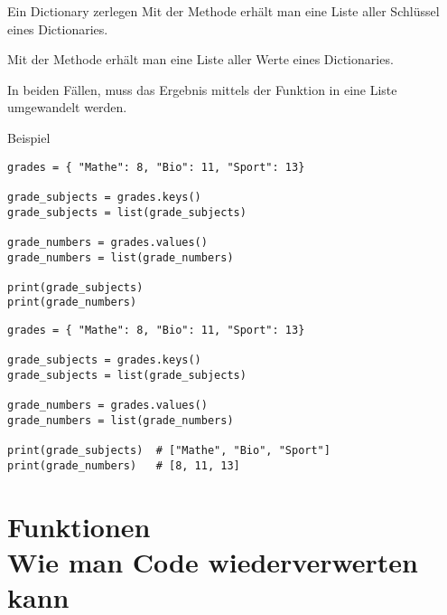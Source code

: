 \begin{fragile}

\begin{block}{Ein Dictionary zerlegen}
\vspace{2pt}
Mit der Methode  erhält man eine Liste aller Schlüssel eines Dictionaries. \pause

Mit der Methode  erhält man eine Liste aller Werte eines Dictionaries. \pause 

In beiden Fällen, muss das Ergebnis mittels der Funktion  in eine Liste umgewandelt werden. 
\end{block}


\vspace{12pt}
\pause 

\begin{exampleblock}{Beispiel}
\vspace{2pt}
\begin{overprint}
\begin{verbatim}
grades = { "Mathe": 8, "Bio": 11, "Sport": 13}

grade_subjects = grades.keys()
grade_subjects = list(grade_subjects)

grade_numbers = grades.values()
grade_numbers = list(grade_numbers)

print(grade_subjects)
print(grade_numbers)
\end{verbatim}
\begin{verbatim}
grades = { "Mathe": 8, "Bio": 11, "Sport": 13}

grade_subjects = grades.keys()
grade_subjects = list(grade_subjects)

grade_numbers = grades.values()
grade_numbers = list(grade_numbers)

print(grade_subjects)  # ["Mathe", "Bio", "Sport"]
print(grade_numbers)   # [8, 11, 13]
\end{verbatim}
\end{overprint}
\end{exampleblock}
\end{fragile}

\section{Funktionen \\ \footnotesize Wie man Code wiederverwerten kann}

